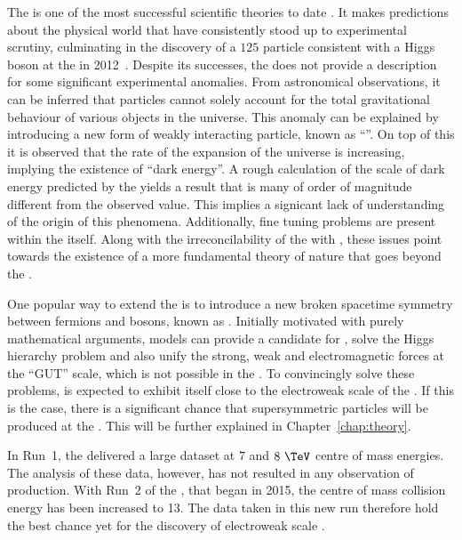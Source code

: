 The \SM is one of the most successful scientific theories to date
\cite{Salam:1964ry,Glashow:1961tr,PhysRevLett.19.1264}. It makes
predictions about the physical world that have consistently stood up
to experimental scrutiny, culminating in the discovery of a $125$\gev
particle consistent with a Higgs boson at the \LHC in
2012~\cite{1207.7214,1207.7235}.  Despite its successes, the \SM does
not provide a description for some significant experimental anomalies.
From astronomical observations, it can be inferred that \SM particles
cannot solely account for the total gravitational behaviour of various
objects in the universe. This anomaly can be explained by introducing
a new form of weakly interacting particle, known as ``\DM''. On top of
this it is observed that the rate of the expansion of the universe is
increasing, implying the existence of ``dark energy''. A rough
calculation of the scale of dark energy predicted by the \SM yields a
result that is many of order of magnitude different from the observed
value. This implies a signicant lack of understanding of the origin of
this phenomena.  Additionally, fine tuning problems are present within
the \SM itself.  Along with the irreconcilability of the \SM with \GR,
these issues point towards the existence of a more fundamental theory
of nature that goes beyond the \SM. 

One popular way to extend the \SM is to introduce a new broken
spacetime symmetry between fermions and bosons, known as
\SUSY. Initially motivated with purely mathematical arguments, \SUSY
models can provide a candidate for \DM, solve the Higgs
hierarchy problem and also unify the strong, weak and electromagnetic
forces at the ``GUT'' scale, which is not possible in the \SM. To
convincingly solve these problems, \SUSY is expected to exhibit itself
close to the electroweak scale of the \SM. If this is the case, there
is a significant chance that supersymmetric particles will be produced
at the \LHC. This will be further explained in
Chapter~\ref{chap:theory}.

In Run~1, the \LHC delivered a large dataset at $7$ and $8~\tev$ centre
of mass energies. The analysis of these data, however, has not
resulted in any observation of \SUSY production. With Run~2 of the
\LHC, that began in 2015, the centre of mass collision energy has been 
increased to 13\tev. The data taken in this new run therefore hold the
best chance yet for the discovery of electroweak scale \SUSY.

